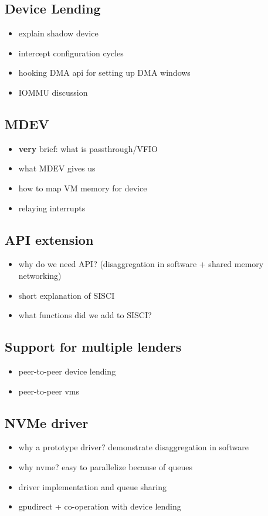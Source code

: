 \subsection{Device Lending}
\begin{itemize}
    \item explain shadow device
    \item intercept configuration cycles
    \item hooking DMA api for setting up DMA windows
    \item IOMMU discussion
\end{itemize}

\subsection{MDEV}
\begin{itemize}
    \item \textbf{very} brief: what is passthrough/VFIO
    \item what MDEV gives us
    \item how to map VM memory for device
    \item relaying interrupts
\end{itemize}

\subsection{API extension}
\begin{itemize}
    \item why do we need API? (disaggregation in software + shared memory networking)
    \item short explanation of SISCI
    \item what functions did we add to SISCI?
\end{itemize}

\subsection{Support for multiple lenders}
\begin{itemize}
    \item peer-to-peer device lending
    \item peer-to-peer vms
\end{itemize}


\subsection{NVMe driver}\label{sec:nvme}
\begin{itemize}
    \item why a prototype driver? demonstrate disaggregation in software
    \item why nvme? easy to parallelize because of queues
    \item driver implementation and queue sharing
    \item gpudirect + co-operation with device lending
\end{itemize}

